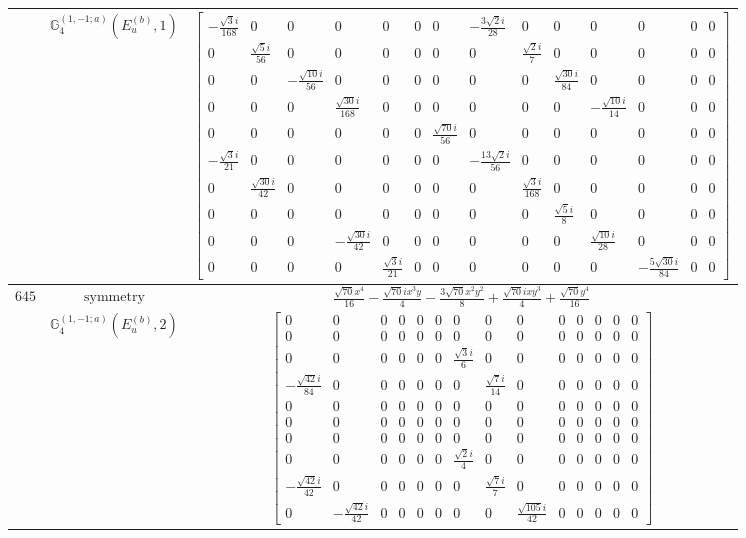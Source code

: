 \documentclass[fleqn,8pt,landscape]{jsarticle}
\begin{document}
\begin{longtable}{ccc}
$  $ & $ \mathbb{G}_{4}^{(1,-1;a)}(E_{u}^{(b)},1) $ & $ \begin{bmatrix} - \frac{\sqrt{3} i}{168} & 0 & 0 & 0 & 0 & 0 & 0 & - \frac{3 \sqrt{2} i}{28} & 0 & 0 & 0 & 0 & 0 & 0 \\ 0 & \frac{\sqrt{5} i}{56} & 0 & 0 & 0 & 0 & 0 & 0 & \frac{\sqrt{2} i}{7} & 0 & 0 & 0 & 0 & 0 \\ 0 & 0 & - \frac{\sqrt{10} i}{56} & 0 & 0 & 0 & 0 & 0 & 0 & \frac{\sqrt{30} i}{84} & 0 & 0 & 0 & 0 \\ 0 & 0 & 0 & \frac{\sqrt{30} i}{168} & 0 & 0 & 0 & 0 & 0 & 0 & - \frac{\sqrt{10} i}{14} & 0 & 0 & 0 \\ 0 & 0 & 0 & 0 & 0 & 0 & \frac{\sqrt{70} i}{56} & 0 & 0 & 0 & 0 & 0 & 0 & 0 \\ - \frac{\sqrt{3} i}{21} & 0 & 0 & 0 & 0 & 0 & 0 & - \frac{13 \sqrt{2} i}{56} & 0 & 0 & 0 & 0 & 0 & 0 \\ 0 & \frac{\sqrt{30} i}{42} & 0 & 0 & 0 & 0 & 0 & 0 & \frac{\sqrt{3} i}{168} & 0 & 0 & 0 & 0 & 0 \\ 0 & 0 & 0 & 0 & 0 & 0 & 0 & 0 & 0 & \frac{\sqrt{5} i}{8} & 0 & 0 & 0 & 0 \\ 0 & 0 & 0 & - \frac{\sqrt{30} i}{42} & 0 & 0 & 0 & 0 & 0 & 0 & \frac{\sqrt{10} i}{28} & 0 & 0 & 0 \\ 0 & 0 & 0 & 0 & \frac{\sqrt{3} i}{21} & 0 & 0 & 0 & 0 & 0 & 0 & - \frac{5 \sqrt{30} i}{84} & 0 & 0 \end{bmatrix} $ \\ \hline
$ 645 $ & $ \text{symmetry} $ & $ \frac{\sqrt{70} x^{4}}{16} - \frac{\sqrt{70} i x^{3} y}{4} - \frac{3 \sqrt{70} x^{2} y^{2}}{8} + \frac{\sqrt{70} i x y^{3}}{4} + \frac{\sqrt{70} y^{4}}{16} $ \\
$  $ & $ \mathbb{G}_{4}^{(1,-1;a)}(E_{u}^{(b)},2) $ & $ \begin{bmatrix} 0 & 0 & 0 & 0 & 0 & 0 & 0 & 0 & 0 & 0 & 0 & 0 & 0 & 0 \\ 0 & 0 & 0 & 0 & 0 & 0 & 0 & 0 & 0 & 0 & 0 & 0 & 0 & 0 \\ 0 & 0 & 0 & 0 & 0 & 0 & \frac{\sqrt{3} i}{6} & 0 & 0 & 0 & 0 & 0 & 0 & 0 \\ - \frac{\sqrt{42} i}{84} & 0 & 0 & 0 & 0 & 0 & 0 & \frac{\sqrt{7} i}{14} & 0 & 0 & 0 & 0 & 0 & 0 \\ 0 & 0 & 0 & 0 & 0 & 0 & 0 & 0 & 0 & 0 & 0 & 0 & 0 & 0 \\ 0 & 0 & 0 & 0 & 0 & 0 & 0 & 0 & 0 & 0 & 0 & 0 & 0 & 0 \\ 0 & 0 & 0 & 0 & 0 & 0 & 0 & 0 & 0 & 0 & 0 & 0 & 0 & 0 \\ 0 & 0 & 0 & 0 & 0 & 0 & \frac{\sqrt{2} i}{4} & 0 & 0 & 0 & 0 & 0 & 0 & 0 \\ - \frac{\sqrt{42} i}{42} & 0 & 0 & 0 & 0 & 0 & 0 & \frac{\sqrt{7} i}{7} & 0 & 0 & 0 & 0 & 0 & 0 \\ 0 & - \frac{\sqrt{42} i}{42} & 0 & 0 & 0 & 0 & 0 & 0 & \frac{\sqrt{105} i}{42} & 0 & 0 & 0 & 0 & 0 \end{bmatrix} $ \\ \hline

\end{longtable}
\end{document}
